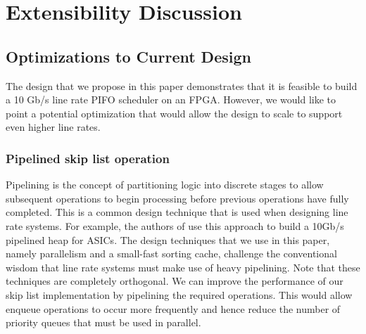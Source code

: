 \section{Extensibility Discussion}

\subsection{Optimizations to Current Design}\label{sec:optimizations}
The design that we propose in this paper demonstrates that it is feasible to build a 10 Gb/s line rate PIFO scheduler on an FPGA. However, we would like to point a potential optimization that would allow the design to scale to support even higher line rates.

\subsubsection*{Pipelined skip list operation}
Pipelining is the concept of partitioning logic into discrete stages to allow subsequent operations to begin processing before previous operations have fully completed. This is a common design technique that is used when designing line rate systems. For example, the authors of \cite{pipelined-heap-2007} use this approach to build a 10Gb/s pipelined heap for ASICs. The design techniques that we use in this paper, namely parallelism and a small-fast sorting cache, challenge the conventional wisdom that line rate systems must make use of heavy pipelining. Note that these techniques are completely orthogonal. We can improve the performance of our skip list implementation by pipelining the required operations. This would allow enqueue operations to occur more frequently and hence reduce the number of priority queues that must be used in parallel.

